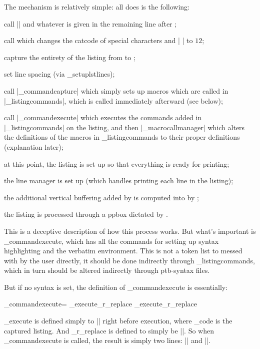 The mechanism is relatively simple: all \pdftoolbox{} does is the following:
\benum
    \item call \inlinecode|\the\everylisting| and whatever is given in the remaining line after \macro\blisting;
    \item call \macro\setupverb{} which changes the catcode of special characters and \inlinecode|^^M| to $12$;
    \item capture the entirety of the listing from \macro\blisting{} to \macro\elisting;
    \item set line spacing (via \macro\_setuplstlines);
    \item call \inlinecode|\the\_commandcapture| which simply sets up macros which are called in \inlinecode|\the\_listingcommands|, which is called immediately afterward (see below);
    \item call \inlinecode|\the\_commandexecute| which executes the commands added in \inlinecode|\the\_listingcommands| on the listing, and then \inlinecode|\the\_macrocallmanager| which alters the definitions of the macros in
        \macro\_listingcommands{} to their proper definitions (explanation later);
    \item at this point, the listing is set up so that everything is ready for printing;
    \item the line manager is set up (which handles printing each line in the listing);
    \item the additional vertical buffering added by \macro\syntaxoutbox{} is computed into \macro\syntaxoutboxbuf{} by \macro\syntaxoutboxsetbuf;
    \item the listing is processed through a ppbox dictated by \macro\syntaxoutbox.
\eenum

This is a deceptive description of how this process works.
But what's important is \macro\_commandexecute, which has all the commands for setting up syntax highlighting and the verbatim environment.
This is not a token list to messed with by the user directly, it should be done indirectly through \macro\_listingcommands, which in turn should be altered indirectly through ptb-syntax files.

But if no syntax is set, the definition of \macro\_commandexecute{} is essentially:

\blisting
\_commandexecute={
    \_execute{\_r_replace{ }{\w \w}}
    \_execute{\_r_replace{^^M}{\w\n\n\w}}
}
\elisting

\macro\_execute{} is defined simply to \inlinecode|\def\_execute#1{#1\_code}| right before execution, where \macro\_code{} is the captured listing.
And \macro\_r_replace{} is defined to simply be \inlinecode|\def\_r_replace#1#2#3{\replace{#3}{#1}{#2}}|.
So when \macro\_commandexecute{} is called, the result is simply two lines: \inlinecode|| and \inlinecode||.

